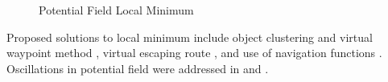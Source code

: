\documentclass[numbered,pdftex]{ohio-etd}
\begin{document}
 

\begin{figure}[H]
	\begin{subfigmatrix}{2}%
		\centering
	\end{subfigmatrix}
	\caption{Potential Field Local Minimum \cite{liu_virtual-waypoint_2016}}
	\label{fig:pfLocalMin}
\end{figure}

Proposed solutions to local minimum include object clustering and virtual waypoint method \cite{liu_virtual-waypoint_2016}, virtual escaping route \cite{kim_escaping_2009}, and use of navigation functions \cite{goerzen_survey_2010}. Oscillations in potential field were addressed in \cite{lei_tang_novel_2010} and \cite{li_efficient_2012}.
\end{document}
